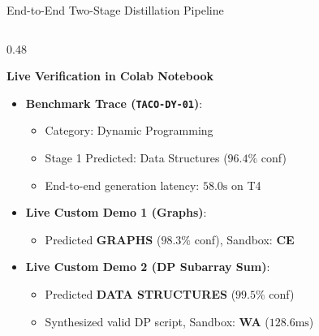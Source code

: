 \documentclass[aspectratio=169,10pt]{beamer}
\begin{document}
\begin{frame}{End-to-End Two-Stage Distillation Pipeline}
\begin{columns}[T]
    \begin{column}{0.48\textwidth}
      \begin{exampleblock}{\textbf{Live Verification in Colab Notebook}}
        \begin{itemize}\itemsep=2.5pt\scriptsize
          \item \textbf{Benchmark Trace (\texttt{TACO-DY-01})}:
            \begin{itemize}\tiny
              \item Category: Dynamic Programming
              \item Stage 1 Predicted: Data Structures ($96.4\%$ conf)
              \item End-to-end generation latency: $58.0\text{s}$ on T4
            \end{itemize}
          \item \textbf{Live Custom Demo 1 (Graphs)}:
            \begin{itemize}\tiny
              \item Predicted \textbf{GRAPHS} ($98.3\%$ conf), Sandbox: \textbf{CE}
            \end{itemize}
          \item \textbf{Live Custom Demo 2 (DP Subarray Sum)}:
            \begin{itemize}\tiny
              \item Predicted \textbf{DATA STRUCTURES} ($99.5\%$ conf)
              \item Synthesized valid DP script, Sandbox: \textbf{WA} ($128.6\text{ms}$)
            \end{itemize}
        \end{itemize}
      \end{exampleblock}
    \end{column}
  \end{columns}
\end{frame}
\end{document}
